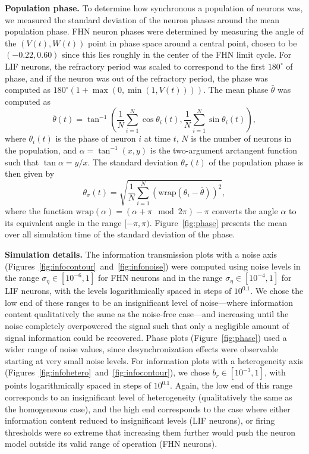 \documentclass[12pt]{article}
\begin{document}
\textbf{Population phase.} To determine how synchronous a population of neurons was, we measured the standard deviation of the neuron phases around the mean population phase. FHN neuron phases were determined by measuring the angle of the $(V(t),W(t))$ point in phase space around a central point, chosen to be $(-0.22,0.60)$ since this lies roughly in the center of the FHN limit cycle. For LIF neurons, the refractory period was scaled to correspond to the first $180^\circ$ of phase, and if the neuron was out of the refractory period, the phase was computed as $180^\circ ( 1 + \max(0,\min(1,V(t))) )$. The mean phase $\bar\theta$ was computed as
\begin{equation}
  \bar\theta(t) = \tan^{-1} \left( \frac{1}{N}\sum\limits_{i=1}^N \cos\theta_i(t),
                                  \frac{1}{N}\sum\limits_{i=1}^N \sin\theta_i(t) \right),
\end{equation}
where $\theta_i(t)$ is the phase of neuron $i$ at time $t$, $N$ is the number of neurons in the population, and $\alpha = \tan^{-1}(x,y)$ is the two-argument arctangent function such that $\tan\alpha = y/x$. The standard deviation $\theta_\sigma(t)$ of the population phase is then given by
\begin{equation}
  \theta_\sigma(t) = \sqrt{ \frac{1}{N} \sum\limits_{i=1}^N (\mathrm{wrap}(\theta_i - \bar\theta))^2 },
\end{equation}
where the function $\mathrm{wrap}(\alpha) = (\alpha + \pi \mod 2\pi) - \pi$ converts the angle $\alpha$ to its equivalent angle in the range $[-\pi,\pi)$. Figure~\ref{fig:phase} presents the mean over all simulation time of the standard deviation of the phase.

\textbf{Simulation details.} The information transmission plots with a noise axis (Figures~\ref{fig:infocontour}~and~\ref{fig:infonoise}) were computed using noise levels in the range $\sigma_\eta \in [10^{-6},1]$ for FHN neurons and in the range $\sigma_\eta \in [10^{-4},1]$ for LIF neurons, with the levels logarithmically spaced in steps of $10^{0.1}$. We chose the low end of these ranges to be an insignificant level of noise---where information content qualitatively the same as the noise-free case---and increasing until the noise completely overpowered the signal such that only a negligible amount of signal information could be recovered. Phase plots (Figure~\ref{fig:phase}) used a wider range of noise values, since desynchronization effects were observable starting at very small noise levels. For information plots with a heterogeneity axis (Figures~\ref{fig:infohetero}~and~\ref{fig:infocontour}), we chose $b_r \in [10^{-3}, 1]$, with points logarithmically spaced in steps of $10^{0.1}$. Again, the low end of this range corresponds to an insignificant level of heterogeneity (qualitatively the same as the homogeneous case), and the high end corresponds to the case where either information content reduced to insignificant levels (LIF neurons), or firing thresholds were so extreme that increasing them further would push the neuron model outside its valid range of operation (FHN neurons).
\end{document}
